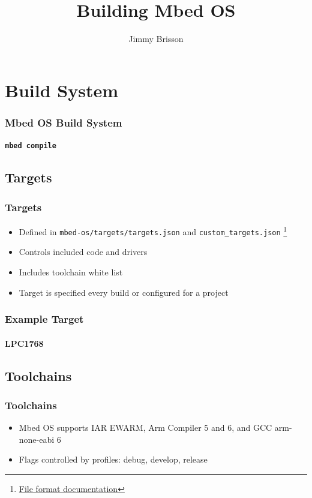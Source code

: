 \documentclass{beamer}
\title{Building Mbed OS}
\author{Jimmy Brisson}
\begin{document}
\frame{\titlepage}
\section{Build System}
\begin{frame}
  \frametitle{Mbed OS Build System}
  \framesubtitle{\texttt{mbed compile}}
  \tableofcontents[currentsection]
\end{frame}
\subsection{Targets}
\begin{frame}
  \frametitle{Targets}
  \begin{itemize}
  \item Defined in \texttt{mbed-os/targets/targets.json} and \texttt{custom\_targets.json}
  \footnote{\href{https://os.mbed.com/docs/v5.6/tools/adding-and-configuring-targets.html}{File format documentation}}
  \item Controls included code and drivers
  \item Includes toolchain white list
  \item Target is specified every build or configured for a project
  \end{itemize}
\end{frame}
\begin{frame}[fragile]
  \frametitle{Example Target}
  \framesubtitle{LPC1768}
  
\end{frame}
\subsection{Toolchains}
\begin{frame}
  \frametitle{Toolchains}
  \begin{itemize}
    \item Mbed OS supports IAR EWARM, Arm Compiler 5 and 6, and GCC arm-none-eabi 6
    \item Flags controlled by profiles: debug, develop, release
  \end{itemize}
  
\end{frame}
\end{document}
